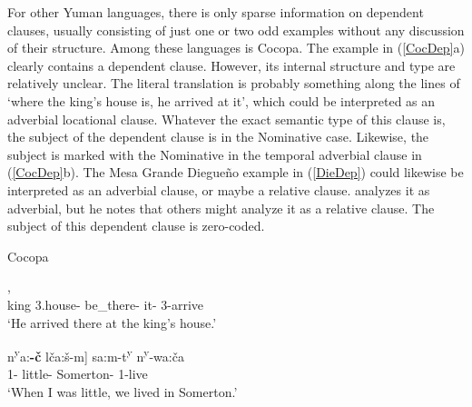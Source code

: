 For other Yuman languages, there is only sparse information on dependent clauses, usually consisting of just one or two odd examples without any discussion of their structure. 
Among these languages is Cocopa.
The example in (\ref{CocDep}a) clearly contains a dependent clause. 
However, its internal structure and type are relatively unclear.
The literal translation is probably something along the lines of `where the king's house is, he arrived at it', which could be interpreted as an adverbial locational clause. 
Whatever the exact semantic type of this clause is, the subject of the dependent clause is in the Nominative  case. 
Likewise, the subject is marked with the Nominative  in the temporal adverbial clause in (\ref{CocDep}b).
The Mesa Grande Diegue\~no example in (\ref{DieDep}) could likewise be interpreted as an adverbial clause, or maybe a relative clause.
\citet[135]{Gorbet:1976} analyzes it as adverbial, but he notes that others might analyze it as a relative clause.
The subject of this dependent clause is zero-coded.

\begin{exe}\ex\label{CocDep} {Cocopa} \citetext{Yuman; California; \citealt[191]{Crawford:1966}, \citealp[325]{Langdon.Munro:1979}}\nopagebreak[4]
\begin{xlist} 
\ex\gll  {\rm[}  \textipa{\textsubdot say\'a-m}{\rm]},  \\
king 3\sg{}.house-\nom{} be\_there-\dsbj{} it-\loc{} 3-arrive\\
`He arrived there at the king's house.' %

\ex\gll  {\rm[}\textglotstop n\textsuperscript{y}a:\textbf{-\v c} l\v ca:\v s-m{\rm]} sa:m-t\textsuperscript{y} n\textsuperscript{y}-\textschwa wa:\v ca\\
1\sg{}-\nom{} little-\dsbj{} Somerton-\loc{} 1-live\\
`When I was little, we lived in Somerton.'
\end{xlist}
\end{exe} %


